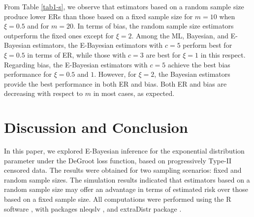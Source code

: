 \documentclass[twoside]{article}
\begin{document}
From Table \ref{tab1-s}, we observe that estimators based on a random sample size produce lower ERs than those based on a fixed sample size  for $m=10$ when $\xi=0.5$ and for $m=20$. In terms of bias, the random sample size estimators outperform the fixed ones except for $\xi=2$. Among the ML, Bayesian, and E-Bayesian estimators, 
the E-Bayesian estimators with $c=5$ perform best for $\xi=0.5$ in terms of ER, while those with $c=3$ are best for $\xi=1$ in this respect. Regarding bias, 
the E-Bayesian estimators with $c=5$ achieve the best bias performance for $\xi=0.5$ and $1$.  However, for $\xi=2$, the Bayesian estimators provide the best performance in both ER and bias. Both ER and bias are decreasing with respect to $m$ in most cases, as expected.
\clearpage
\section*{Discussion and Conclusion}   
In this paper, we explored E-Bayesian inference for the exponential distribution parameter under the DeGroot loss function, based on progressively Type-II censored data.
The results were obtained for two sampling scenarios: fixed and random sample sizes. The simulation results indicated that estimators based on a random sample size may offer an advantage in terms of estimated risk over those based on a fixed sample size. All computations were performed using the R software   \citep{R:Core:Team:2024}, with  packages {\sf nleqslv} \citep{Hasselman:2023}, and {\sf extraDistr} package \citep{Wolodzko:2023}.
\end{document}
